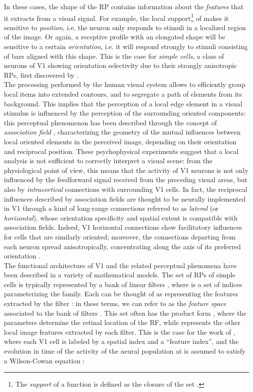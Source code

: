 \documentclass[11pt,oneside,reqno]{amsart}
\begin{document}
 In these cases, the shape of the RP contains information about the \emph{features} that it extracts from a visual signal. For example, the local support\footnote{The \emph{support} of a function  is defined as the closure of the set .} of  makes it sensitive to \emph{position}, i.e. the neuron only responds to stimuli in a localized region of the image. Or again, a receptive profile with an elongated shape will be sensitive to a certain \emph{orientation}, i.e. it will respond strongly to stimuli consisting of bars aligned with this shape. This is the case for \emph{simple cells}, a class of neurons of V1 showing orientation selectivity due to their strongly anisotropic RPs, first discovered by \citet{HW}.\\
 
 The processing performed by the human visual system allows to efficiently group local items into extended contours, and to segregate a path of elements from its background. This implies that the perception of a local edge element in a visual stimulus is influenced by the perception of the surrounding oriented components: this perceptual phenomenon has been described through the concept of \emph{association field} \citep{field}, characterizing the geometry of the mutual influences between local oriented elements in the perceived image, depending on their orientation and reciprocal position. These psychophysical experiments suggest that a local analysis is not sufficient to correctly interpret a visual scene: from the physiological point of view, this means that the activity of V1 neurons is not only influenced by the feedforward signal received from the preceding visual areas, but also by \emph{intracortical} connections with surrounding V1 cells. In fact, the reciprocal influences described by association fields are thought to be neurally implemented in V1 through a kind of long-range connections referred to as \emph{lateral} (or \emph{horizontal}), whose orientation specificity and spatial extent is compatible with association fields. Indeed, V1 horizontal connections show facilitatory influences for cells that are similarly oriented; moreover, the connections departing from each neuron spread anisotropically, concentrating along the axis of its preferred orientation \cite[see e.g.][]{bosking}.\\


 The functional architecture of V1 and the related perceptual phenomena have been described in a variety of mathematical models. The set of RPs of simple cells is typically represented by a bank of linear filters , where  is a set of indices parameterizing the family. Each  can be thought of as representing the features extracted by the filter : in these terms, we can refer to  as the \emph{feature space} associated to the bank of filters . This set often has the product form , where the parameters  determine the retinal location of the RF, while  represents the other local image features extracted by each filter. This is the case for the work of \citet{bresscow03}, where each V1 cell is labeled by a spatial index and a ``feature index'', and the evolution in time  of the activity of the neural population at  is assumed to satisfy a Wilson-Cowan equation \citep{wilcow}:
 
\end{document}
